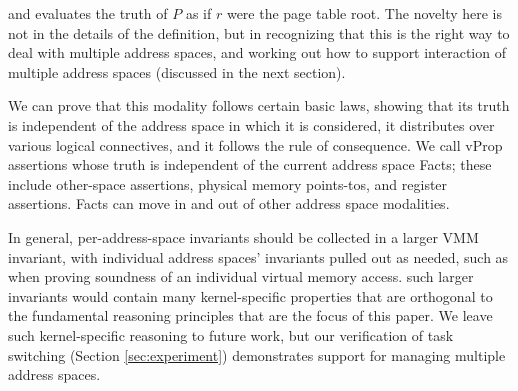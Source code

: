 and evaluates the truth of $P$ as if $r$ were the page table root. 
The novelty here is not in the details of the definition, but in recognizing that this is the right way to deal with
multiple address spaces, and working out how to support interaction of multiple address spaces (discussed in the next section).

We can prove that this modality follows certain basic laws, showing that its truth is independent of the address
space in which it is considered,  it distributes over various logical connectives, and  it follows the rule of
consequence.
We call \textsf{vProp} assertions whose truth is independent of the current address space
\textsf{Fact}s; these include other-space assertions, physical memory points-tos, and register assertions.
\textsf{Fact}s can  move in and out of other address space modalities.

In general, per-address-space invariants should be collected in a larger
VMM invariant, with individual address spaces' invariants pulled out as needed, such as when proving
soundness of an individual virtual memory access.
 such larger invariants would contain many kernel-specific properties that are orthogonal
to the fundamental reasoning principles that are the focus of this paper.
We leave such kernel-specific reasoning to future work, but our verification of task switching
(Section \ref{sec:experiment}) demonstrates support for managing multiple address spaces.



  


